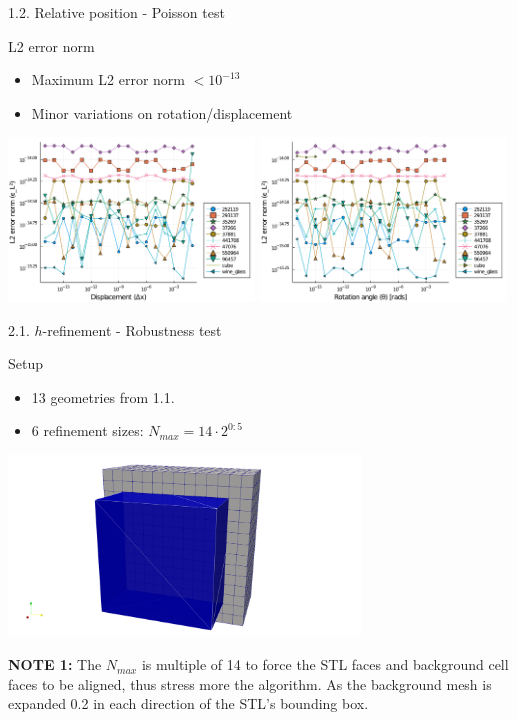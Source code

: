 \documentclass{beamer}
\begin{document}
\begin{frame}{1.2. Relative position - Poisson test}

  \begin{block}{L2 error norm}
  \begin{itemize}
    \item
      Maximum L2 error norm $< 10^{-13}$
    \item
      Minor variations on rotation/displacement
  \end{itemize}
  \end{block}

  \includegraphics[width=0.49\textwidth]{../analysis/plots/x_displacement_y_error_l2}
  \includegraphics[width=0.49\textwidth]{../analysis/plots/x_rotation_y_error_l2}
\end{frame}


\begin{frame}{2.1. $h$-refinement - Robustness test}
  \begin{block}{Setup}
    \begin{itemize}
      \item
        13 geometries from 1.1.
      \item
        6 refinement sizes: $N_{max} = 14 \cdot 2^{0:5}$
    \end{itemize}
  \end{block}

  \includegraphics[width=0.7\textwidth]{cube_bb}

  \textbf{NOTE 1:} The $N_{max}$ is multiple of 14 to force the STL faces and background cell faces to be aligned, thus stress more the algorithm. As the background mesh is expanded 0.2 in each direction of the STL's bounding box.
\end{frame}
\end{document}
